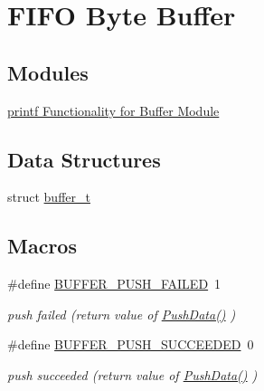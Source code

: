 \hypertarget{group__buffer}{}\section{F\+I\+F\+O Byte Buffer}
\label{group__buffer}
\subsection*{Modules}
\begin{DoxyCompactItemize}
\item 
\hyperlink{group__buffer__printf}{printf Functionality for Buffer Module}
\end{DoxyCompactItemize}
\subsection*{Data Structures}
\begin{DoxyCompactItemize}
\item 
struct \hyperlink{structbuffer__t}{buffer\+\_\+t}
\end{DoxyCompactItemize}
\subsection*{Macros}
\begin{DoxyCompactItemize}
\item 
\#define \hyperlink{group__buffer_ga8b3828d728c4b468929da4c0a9ac421e}{B\+U\+F\+F\+E\+R\+\_\+\+P\+U\+S\+H\+\_\+\+F\+A\+I\+L\+E\+D}~1
\begin{DoxyCompactList}\small\item\em push failed (return value of \hyperlink{group__buffer_ga1a97e2269e9b21fc61b6e72ffdd2e374}{Push\+Data()} ) \end{DoxyCompactList}\item 
\#define \hyperlink{group__buffer_ga3fe3330725cee94f2c690f7e394a7cb0}{B\+U\+F\+F\+E\+R\+\_\+\+P\+U\+S\+H\+\_\+\+S\+U\+C\+C\+E\+E\+D\+E\+D}~0
\begin{DoxyCompactList}\small\item\em push succeeded (return value of \hyperlink{group__buffer_ga1a97e2269e9b21fc61b6e72ffdd2e374}{Push\+Data()} ) \end{DoxyCompactList}\end{DoxyCompactItemize}

